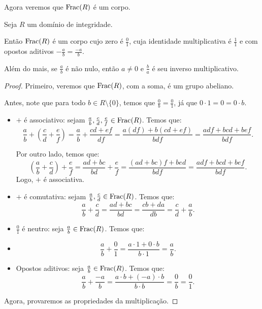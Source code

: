 Agora veremos que $\operatorname{Frac}(R)$ é um corpo.
\begin{theorem}
    Seja $R$ um domínio de integridade.
    
    Então $\operatorname{Frac}(R)$ é um corpo cujo zero é $\frac{0}{1}$, cuja identidade multiplicativa é $\frac{1}{1}$ e com opostos aditivos $-\frac{a}{b}=\frac{-a}{b}$.

    Além do mais, se $\frac{a}{b}$ é não nulo, então $a\neq 0$ e $\frac{b}{a}$ é seu inverso multiplicativo.
\end{theorem}
\begin{proof}
    Primeiro, veremos que $\operatorname{Frac}(R)$, com a soma, é um grupo abeliano.

    Antes, note que para todo $b \in R\setminus\{0\}$, temos que $\frac{0}{b}=\frac{0}{1}$, já que $0\cdot 1=0=0\cdot b$.

    \begin{itemize}
        \item $+$ é associativo: sejam $\frac{a}{b}, \frac{c}{d}, \frac{e}{f} \in \operatorname{Frac}(R)$. Temos que:
        \[\frac{a}{b}+\left(\frac{c}{d}+\frac{e}{f}\right)=\frac{a}{b}+\frac{cd+ef}{df}=\frac{a(df)+b(cd+ef)}{bdf}=\frac{adf+bcd+bef}{bdf}.\]

        Por outro lado,  temos que:
        \[\left(\frac{a}{b}+\frac{c}{d}\right)+\frac{e}{f}=\frac{ad+bc}{bd}+\frac{e}{f}=\frac{(ad+bc)f+bed}{bdf}=\frac{adf+bcd+bef}{bdf}.\]
        Logo, $+$ é associativa.

        \item $+$ é comutativa: sejam $\frac{a}{b}, \frac{c}{d} \in \operatorname{Frac}(R)$. Temos que:
        \[\frac{a}{b}+\frac{c}{d}=\frac{ad+bc}{bd}=\frac{cb+da}{db}=\frac{c}{d}+\frac{a}{b}.\]

        \item $\frac{0}{1}$ é neutro: seja $\frac{a}{b} \in \operatorname{Frac}(R)$. Temos que:
        \item \[\frac{a}{b}+\frac{0}{1}=\frac{a\cdot 1+0\cdot b}{b\cdot 1}=\frac{a}{b}.\]
        
        \item Opostos aditivos: seja $\frac{a}{b} \in \operatorname{Frac}(R)$. Temos que:
        \[\frac{a}{b}+\frac{-a}{b}=\frac{a\cdot b+(-a)\cdot b}{b\cdot b}=\frac{0}{b}=\frac{0}{1}.\]
    \end{itemize}

    Agora, provaremos as propriedades da multiplicação.


\end{proof}
